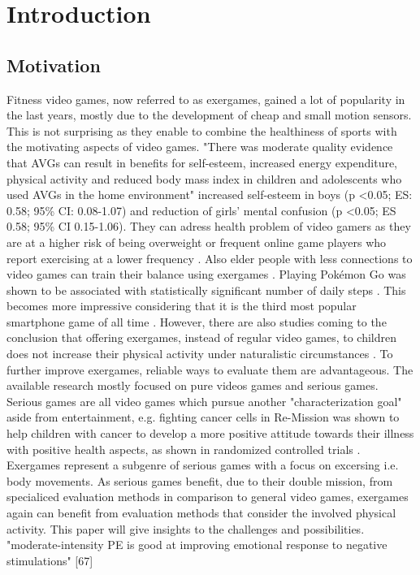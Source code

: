 \chapter{Introduction}
\label{ch:introduction}


\section{Motivation}
Fitness video games, now referred to as exergames, gained a lot of popularity in the last years, mostly due to the development of cheap and small motion sensors. This is not surprising as they enable to combine the healthiness of sports with the motivating aspects of video games.
"There was moderate quality evidence that AVGs can result in benefits for self-esteem, increased energy
expenditure, physical activity and reduced body mass index in children and adolescents who used
AVGs in the home environment" \cite{santos2020active}
increased self-esteem in boys (p <0.05; ES: 0.58; 95\% CI: 0.08-1.07) and reduction of girls’ mental confusion (p <0.05; ES 0.58; 95\% CI 0.15-1.06).\cite{andrade2020effect}
They can adress health problem of video gamers as they are at a higher risk of being overweight \cite{melchior2014internet} or frequent online game players who report exercising at a lower frequency \cite{kowert2014unpopular}. Also elder people with less connections to video games can train their balance using exergames \cite{lai2013effects}. Playing Pokémon Go was shown to be associated with statistically significant number of daily steps \cite{khamzina2019impact}. This becomes more impressive considering that it is the third most popular smartphone game of all time \cite{link_pokemongo}. However, there are also studies coming to the conclusion that offering exergames, instead of regular video games, to children does not increase their physical activity under naturalistic circumstances \cite{baranowski2012impact}. 
To further improve exergames, reliable ways to evaluate them are advantageous. The available research mostly focused on pure videos games and serious games. Serious games are all video games which pursue another "characterization goal" aside from entertainment, e.g. fighting cancer cells in Re-Mission \cite{link_remission} was shown to help children with cancer to develop a more positive attitude towards their illness with positive health aspects, as shown in randomized controlled trials \cite{kato2008video}.
Exergames represent a subgenre of serious games with a focus on excersing i.e. body movements. As serious games benefit, due to their double mission, from specialiced evaluation methods \cite{caserman2020quality} in comparison to general video games, exergames again can benefit from evaluation methods that consider the involved physical activity. This paper will give insights to the challenges and possibilities.
"moderate-intensity PE is good at improving emotional response to negative stimulations" [67]

